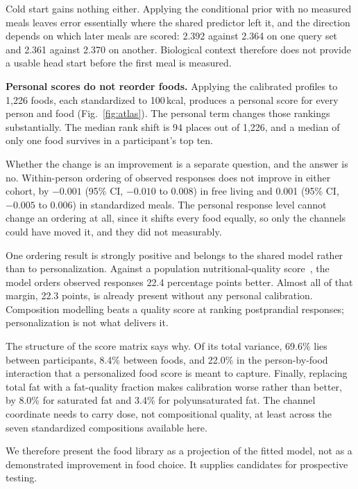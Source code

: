 \documentclass[pdflatex,sn-nature]{sn-jnl}
\theoremstyle{thmstyleone}
\theoremstyle{thmstyletwo}
\theoremstyle{thmstylethree}
\begin{document}
Cold start gains nothing either. Applying the conditional prior with no measured meals leaves error essentially where the shared predictor left it, and the direction depends on which later meals are scored: 2.392 against 2.364 on one query set and 2.361 against 2.370 on another. Biological context therefore does not provide a usable head start before the first meal is measured.

\textbf{Personal scores do not reorder foods.} Applying the calibrated profiles to 1,226 foods, each standardized to 100\,kcal, produces a personal score for every person and food (Fig.~\ref{fig:atlas}). The personal term changes those rankings substantially. The median rank shift is 94 places out of 1,226, and a median of only one food survives in a participant's top ten.

Whether the change is an improvement is a separate question, and the answer is no. Within-person ordering of observed responses does not improve in either cohort, by $-0.001$ (95\% CI, $-0.010$ to 0.008) in free living and 0.001 (95\% CI, $-0.005$ to 0.006) in standardized meals. The personal response level cannot change an ordering at all, since it shifts every food equally, so only the channels could have moved it, and they did not measurably.

One ordering result is strongly positive and belongs to the shared model rather than to personalization. Against a population nutritional-quality score~\cite{barrett}, the model orders observed responses 22.4 percentage points better. Almost all of that margin, 22.3 points, is already present without any personal calibration. Composition modelling beats a quality score at ranking postprandial responses; personalization is not what delivers it.

The structure of the score matrix says why. Of its total variance, 69.6\% lies between participants, 8.4\% between foods, and 22.0\% in the person-by-food interaction that a personalized food score is meant to capture. Finally, replacing total fat with a fat-quality fraction makes calibration worse rather than better, by 8.0\% for saturated fat and 3.4\% for polyunsaturated fat. The channel coordinate needs to carry dose, not compositional quality, at least across the seven standardized compositions available here.

We therefore present the food library as a projection of the fitted model, not as a demonstrated improvement in food choice. It supplies candidates for prospective testing.
\end{document}
